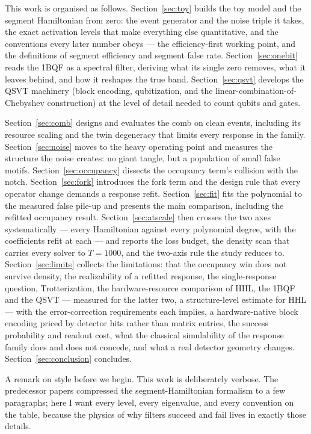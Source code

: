 \documentclass[11pt,a4paper]{article}
\begin{document}
This work is organised as follows. Section~\ref{sec:toy} builds the toy
model and the segment Hamiltonian from zero: the event generator and the
noise triple it takes, the exact activation levels that make everything
else quantitative, and the conventions every later number obeys --- the
efficiency-first working point, and the definitions of segment
efficiency and segment false rate. Section~\ref{sec:onebit} reads the
1BQF as a spectral filter, deriving what its single zero removes, what
it leaves behind, and how it reshapes the true band.
Section~\ref{sec:qsvt} develops the QSVT machinery (block encoding,
qubitization, and the linear-combination-of-Chebyshev construction) at
the level of detail needed to count qubits and gates.

Section~\ref{sec:comb} designs and evaluates the comb on clean events,
including its resource scaling and the twin degeneracy that limits every
response in the family. Section~\ref{sec:noise} moves to the heavy
operating point and measures the structure the noise creates: no giant
tangle, but a population of small false motifs.
Section~\ref{sec:occupancy} dissects the occupancy term's collision with
the notch. Section~\ref{sec:fork} introduces the fork term and the
design rule that every operator change demands a response refit.
Section~\ref{sec:fit} fits the polynomial to the measured false pile-up
and presents the main comparison, including the refitted occupancy
result. Section~\ref{sec:atscale} then crosses the two axes
systematically --- every Hamiltonian against every polynomial degree,
with the coefficients refit at each --- and reports the loss budget, the
density scan that carries every solver to $T=1000$, and the two-axis
rule the study reduces to. Section~\ref{sec:limits} collects the
limitations: that the occupancy win does not survive density, the
realizability of a refitted response, the single-response question,
Trotterization, the hardware-resource comparison of HHL, the 1BQF and
the QSVT --- measured for the latter two, a structure-level estimate for
HHL --- with the error-correction requirements each implies, a
hardware-native block encoding priced by detector hits rather than
matrix entries, the success probability and readout cost, what the
classical simulability of the response family does and does not concede,
and what a real detector geometry changes.
Section~\ref{sec:conclusion} concludes.

A remark on style before we begin. This work is deliberately verbose.
The predecessor papers compressed the segment-Hamiltonian formalism to a
few paragraphs; here I want every level, every eigenvalue, and every
convention on the table, because the physics of why filters succeed and
fail lives in exactly those details.
\end{document}
